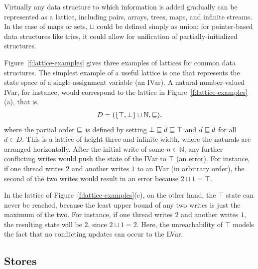 \noindent Virtually any data structure to which information
is added gradually can be represented as a lattice,
including pairs, arrays, trees, maps, and infinite streams.
%
{In the case of maps or sets, $\sqcup$ could be defined simply as union; for
pointer-based data structures like tries, it could allow for unification of partially-initialized structures.}
%

Figure~\ref{f:lattice-examples} gives three examples of lattices for
common data structures.
The simplest example of a useful lattice is one that
represents the state space of a single-assignment variable (an IVar).
A natural-number-valued IVar, for instance, would correspond to the
lattice in Figure~\ref{f:lattice-examples}(a), that is,
\begin{displaymath}
  D = (\lbrace \top, \bot \rbrace \cup \mathbb{N}, \sqsubseteq), 
\end{displaymath}
where the partial order $\sqsubseteq$ is defined by setting $\bot \sqsubseteq d
\sqsubseteq \top$ and $d \sqsubseteq d$ for all $d \in D$.  This is a lattice of
height three and infinite width, where the naturals are arranged
horizontally.  After the initial write of some $n \in \mathbb{N}$, any
further conflicting writes would push the state of the IVar to $\top$
(an error).
For instance, if one thread writes $2$ and another writes $1$ to an
IVar (in arbitrary order), the second of the two writes would result
in an error because $2 \sqcup 1 = \top$.

In the lattice of Figure~\ref{f:lattice-examples}(c), on the other
hand, the $\top$ state can never be reached, because the least upper
bound of any two writes is just the maximum of the two.
For instance, if one thread writes $2$ and another writes $1$, the
resulting state will be $2$, since $2 \sqcup 1 = 2$.
Here, the
unreachability of $\top$ models the fact that no conflicting updates
can occur to the LVar.

\subsection{Stores}\label{subsection:stores}

